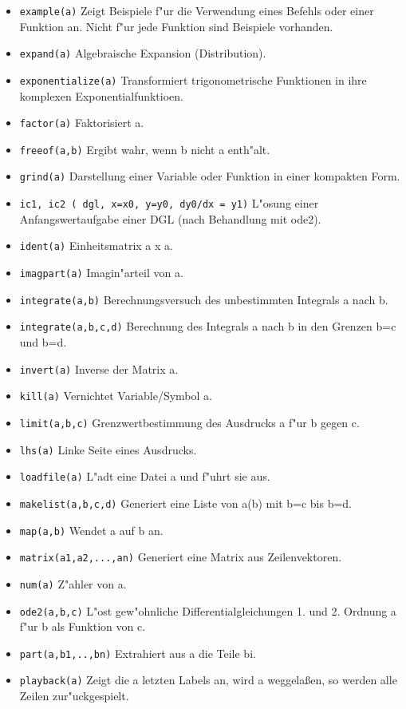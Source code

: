 \documentclass[spanish,12pt,a4paper]{article}
\begin{document}
\begin{itemize}
\item \verb|example(a)| Zeigt Beispiele f"ur die Verwendung eines Befehls oder einer Funktion an. Nicht f"ur jede Funktion sind Beispiele vorhanden.
\item \verb|expand(a)| Algebraische Expansion (Distribution).
\item \verb|exponentialize(a)| Transformiert trigonometrische Funktionen in ihre komplexen Exponentialfunktioen.
\item \verb|factor(a)| Faktorisiert a.
\item \verb|freeof(a,b)| Ergibt wahr, wenn b nicht a enth"alt.
\item \verb|grind(a)| Darstellung einer Variable oder Funktion in einer kompakten Form.
\item \verb|ic1, ic2 ( dgl, x=x0, y=y0, dy0/dx = y1)| L"osung einer Anfangswertaufgabe einer DGL (nach Behandlung mit ode2).
\item \verb|ident(a)| Einheitsmatrix a x a.
\item \verb|imagpart(a)| Imagin"arteil von a.
\item \verb|integrate(a,b)| Berechnungsversuch des unbestimmten Integrals a nach b.
\item \verb|integrate(a,b,c,d)| Berechnung des Integrals a nach b in den Grenzen b=c und b=d.
\item \verb|invert(a)| Inverse der Matrix a.
\item \verb|kill(a)| Vernichtet Variable/Symbol a.
\item \verb|limit(a,b,c)| Grenzwertbestimmung des Ausdrucks a f"ur b gegen c.
\item \verb|lhs(a)| Linke Seite eines Ausdrucks.
\item \verb|loadfile(a)| L"adt eine Datei a und f"uhrt sie aus.
\item \verb|makelist(a,b,c,d)| Generiert eine Liste von a(b) mit b=c bis b=d.
\item \verb|map(a,b)| Wendet a auf b an.
\item \verb|matrix(a1,a2,...,an)| Generiert eine Matrix aus Zeilenvektoren.
\item \verb|num(a)| Z"ahler von a.
\item \verb|ode2(a,b,c)| L"ost gew"ohnliche Differentialgleichungen 1. und 2. Ordnung a f"ur b als Funktion von c.
\item \verb|part(a,b1,..,bn)| Extrahiert aus a die Teile bi.
\item \verb|playback(a)| Zeigt die a letzten Labels an, wird a weggela{\ss}en, so werden alle Zeilen zur"uckgespielt.

\end{itemize}
\end{document}
